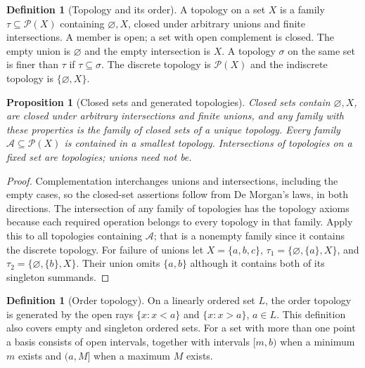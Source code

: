 \documentclass[11pt,oneside,openany]{book}
\newtheorem{proposition}[theorem]{Proposition}
\theoremstyle{definition}
\newtheorem{definition}[theorem]{Definition}
\theoremstyle{remark}
\newcommand{\powset}{\mathcal P}
\begin{document}
\begin{definition}[Topology and its order]\label{d10:01:topology}
A topology on a set $X$ is a family $\tau\subseteq\powset(X)$ containing $\varnothing,X$, closed under arbitrary unions and finite intersections. A member is open; a set with open complement is closed. The empty union is $\varnothing$ and the empty intersection is $X$. A topology $\sigma$ on the same set is finer than $\tau$ if $\tau\subseteq\sigma$. The discrete topology is $\powset(X)$ and the indiscrete topology is $\{\varnothing,X\}$.
\end{definition}

\begin{proposition}[Closed sets and generated topologies]\label{d10:01:generated}
Closed sets contain $\varnothing,X$, are closed under arbitrary intersections and finite unions, and any family with these properties is the family of closed sets of a unique topology. Every family $\mathcal A\subseteq\powset(X)$ is contained in a smallest topology. Intersections of topologies on a fixed set are topologies; unions need not be.
\end{proposition}
\begin{proof}
Complementation interchanges unions and intersections, including the empty cases, so the closed-set assertions follow from De Morgan's laws, in both directions. The intersection of any family of topologies has the topology axioms because each required operation belongs to every topology in that family. Apply this to all topologies containing $\mathcal A$; that is a nonempty family since it contains the discrete topology. For failure of unions let $X=\{a,b,c\}$, $\tau_1=\{\varnothing,\{a\},X\}$, and $\tau_2=\{\varnothing,\{b\},X\}$. Their union omits $\{a,b\}$ although it contains both of its singleton summands.
\end{proof}

\begin{definition}[Order topology]\label{d10:01:order-topology}
On a linearly ordered set $L$, the order topology is generated by the open rays $\{x:x<a\}$ and $\{x:x>a\}$, $a\in L$. This definition also covers empty and singleton ordered sets. For a set with more than one point a basis consists of open intervals, together with intervals $[m,b)$ when a minimum $m$ exists and $(a,M]$ when a maximum $M$ exists.
\end{definition}
\end{document}
